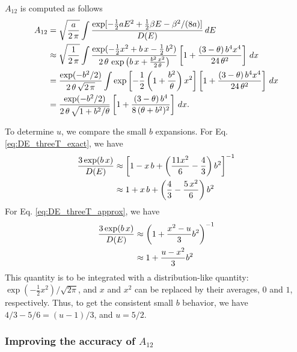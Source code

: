 \documentclass[aip,jcp,preprint,notitlepage, superscriptaddress]{revtex4-1}
\begin{document}
$A_{12}$ is computed as follows
%
\begin{align}
  A_{12}
&=
\sqrt{ \frac a {2 \, \pi} }
\int
  \frac{ \exp[-\frac 1 2 a E^2 + \frac{1}{2} \beta E - \beta^2/(8a) ] }
  { D(E) } \, dE
\notag \\
&\approx
\sqrt{ \frac 1 {2 \, \pi} }
\int
  \frac{ \exp( -\frac 1 2 x^2 + b \, x - \frac{1}{2} \, b^2 ) }
  { 2 \, \theta \,
    \exp\left(
      b \, x
      +
      \frac{ b^2 \, x^2 }
      { 2 \, \theta }
    \right)
  }
  \left[
    1
    +
    \frac{ (3 - \theta) \, b^4 x^4 }
    { 24 \, \theta^2 }
  \right]
 \, d x
\notag \\
&=
\frac { \exp(-b^2 / 2 ) }
{ 2 \, \theta \, \sqrt{2 \, \pi} }
\int
  \exp\left[
    -\frac 1 2
    \left(
      1 + \frac{ b^2 } { \theta }
    \right)
    x^2
  \right]
  \left[
    1
    +
    \frac{ (3 - \theta) \, b^4 x^4 }
    { 24 \, \theta^2 }
  \right]
 \, d x
\notag \\
&=
\frac { \exp(-b^2 / 2) }
{ 2 \, \theta \, \sqrt{1 + b^2/\theta} }
  \left[
    1
    +
    \frac{ (3 - \theta) \, b^4 }
    { 8 \, (\theta + b^2)^2}
  \right]
 \, d x.
\end{align}



To determine $u$,
we compare the small $b$ expansions.
%
For Eq. \eqref{eq:DE_threeT_exact},
we have
%
\begin{align*}
\frac{ 3 \exp(b \, x) }
{ D(E) }
&\approx
\left[
  1 -
  x \, b
  +
  \left(
    \frac{ 11 x^2 } 6
    - \frac 4 3
  \right)
  b^2
\right]^{-1}
\notag \\
&\approx
  1 +
  x \, b
  +
  \left(
    \frac 4 3
    - \frac{ 5 \, x^2 } 6
  \right)
  b^2
\end{align*}
%
For Eq. \eqref{eq:DE_threeT_approx},
we have
%
\begin{align*}
\frac{ 3 \exp(b \, x) }
{ D(E) }
&\approx
\left(
  1 +
  \frac{ x^2 - u } { 3 }
  b^2
\right)^{-1}
\notag \\
&\approx
  1 +
  \frac{ u - x^2 } { 3 }
  b^2
\end{align*}
%
This quantity is to be integrated with
a distribution-like quantity:
$\exp(-\frac1 2 x^2)/\sqrt{2 \pi}$,
and $x$ and $x^2$ can be replaced by their
averages, $0$ and $1$, respectively.
%
Thus,
to get the consistent small $b$ behavior,
we have
$4/3 - 5/6 = (u - 1)/3$,
and $u = 5/2$.




\subsubsection{Improving the accuracy of $A_{12}$}
\end{document}

